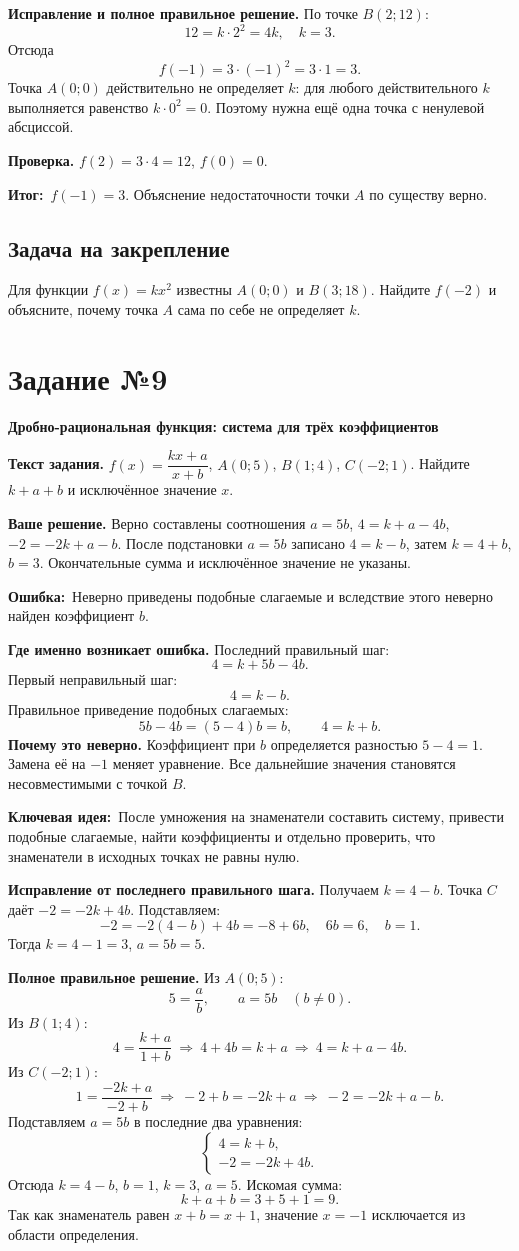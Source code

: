 \documentclass[a4paper,12pt]{article}
\newcommand{\err}{\textcolor{wrong}{\textbf{Ошибка:}}}
\newcommand{\idea}{\textcolor{accent}{\textbf{Ключевая идея:}}}
\newcommand{\res}{\textcolor{accent}{\textbf{Итог:}}}
\newcommand{\taskstart}[2]{\clearpage\phantomsection\label{task:#1}\section*{Задание №#1}\textcolor{accent}{\textbf{#2}}\par\medskip}
\begin{document}
\textbf{Исправление и полное правильное решение.} По точке $B(2;12)$:
\[
12=k\cdot2^2=4k,\quad k=3.
\]
Отсюда
\[
f(-1)=3\cdot(-1)^2=3\cdot1=\boxed{3}.
\]
Точка $A(0;0)$ действительно не определяет $k$: для любого действительного $k$ выполняется равенство $k\cdot0^2=0$. Поэтому нужна ещё одна точка с ненулевой абсциссой.

\textbf{Проверка.} $f(2)=3\cdot4=12$, $f(0)=0$.

\res\ $f(-1)=3$. Объяснение недостаточности точки $A$ по существу верно.

\subsection*{Задача на закрепление}
Для функции $f(x)=kx^2$ известны $A(0;0)$ и $B(3;18)$. Найдите $f(-2)$ и объясните, почему точка $A$ сама по себе не определяет $k$.

\taskstart{9}{Дробно-рациональная функция: система для трёх коэффициентов}
\textbf{Текст задания.} $f(x)=\dfrac{kx+a}{x+b}$, $A(0;5)$, $B(1;4)$, $C(-2;1)$. Найдите $k+a+b$ и исключённое значение $x$.

\textbf{Ваше решение.} Верно составлены соотношения $a=5b$, $4=k+a-4b$, $-2=-2k+a-b$. После подстановки $a=5b$ записано $4=k-b$, затем $k=4+b$, $b=3$. Окончательные сумма и исключённое значение не указаны.

\err\ Неверно приведены подобные слагаемые и вследствие этого неверно найден коэффициент $b$.

\textbf{Где именно возникает ошибка.} Последний правильный шаг:
\[
4=k+5b-4b.
\]
Первый неправильный шаг:
\[
4=k-b.
\]
Правильное приведение подобных слагаемых:
\[
5b-4b=(5-4)b=b,\qquad 4=k+b.
\]
\textbf{Почему это неверно.} Коэффициент при $b$ определяется разностью $5-4=1$. Замена её на $-1$ меняет уравнение. Все дальнейшие значения становятся несовместимыми с точкой $B$.

\idea\ После умножения на знаменатели составить систему, привести подобные слагаемые, найти коэффициенты и отдельно проверить, что знаменатели в исходных точках не равны нулю.

\textbf{Исправление от последнего правильного шага.} Получаем $k=4-b$. Точка $C$ даёт $-2=-2k+4b$. Подставляем:
\[
-2=-2(4-b)+4b=-8+6b,
\quad 6b=6,
\quad b=1.
\]
Тогда $k=4-1=3$, $a=5b=5$.

\textbf{Полное правильное решение.}
Из $A(0;5)$:
\[
5=\frac{a}{b},\qquad a=5b\quad (b\ne0).
\]
Из $B(1;4)$:
\[
4=\frac{k+a}{1+b}
\ \Rightarrow\ 4+4b=k+a
\ \Rightarrow\ 4=k+a-4b.
\]
Из $C(-2;1)$:
\[
1=\frac{-2k+a}{-2+b}
\ \Rightarrow\ -2+b=-2k+a
\ \Rightarrow\ -2=-2k+a-b.
\]
Подставляем $a=5b$ в последние два уравнения:
\[
\begin{cases}
4=k+b,\\
-2=-2k+4b.
\end{cases}
\]
Отсюда $k=4-b$, $b=1$, $k=3$, $a=5$. Искомая сумма:
\[
k+a+b=3+5+1=\boxed{9}.
\]
Так как знаменатель равен $x+b=x+1$, значение $x=-1$ исключается из области определения.
\end{document}

